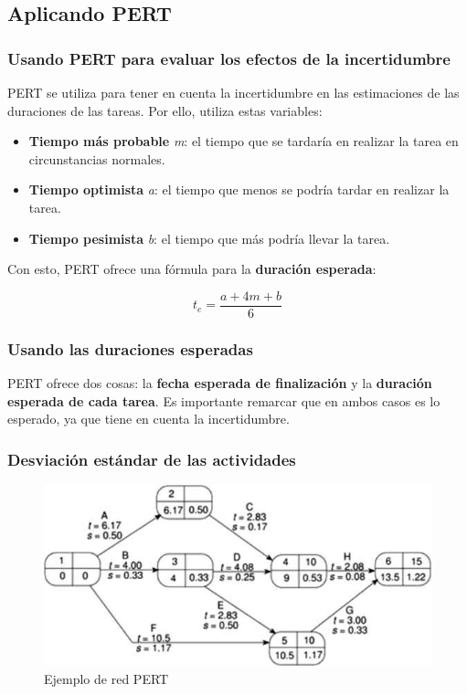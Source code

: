 \documentclass[12pt]{article}
\begin{document}
\subsection{Aplicando PERT}
\label{7.10.0}

\subsubsection{Usando PERT para evaluar los efectos de la incertidumbre}
\label{7.10.1}

{PERT se utiliza para tener en cuenta la incertidumbre en las estimaciones de las duraciones de las tareas. Por ello, utiliza estas variables:}

\begin{itemize}
    \item {\textbf{Tiempo más probable} \textit{m}: el tiempo que se tardaría en realizar la tarea en circunstancias normales.}
    \item {\textbf{Tiempo optimista} \textit{a}: el tiempo que menos se podría tardar en realizar la tarea.}
    \item {\textbf{Tiempo pesimista} \textit{b}: el tiempo que más podría llevar la tarea.}
\end{itemize}

{Con esto, PERT ofrece una fórmula para la \textbf{duración esperada}:}

\begin{equation}
    t_e = \frac{a + 4m + b}{6}
\end{equation}

\subsubsection{Usando las duraciones esperadas}
\label{7.10.2}

{PERT ofrece dos cosas: la \textbf{fecha esperada de finalización} y la \textbf{duración esperada de cada tarea}. Es importante remarcar que en ambos casos es lo esperado, ya que tiene en cuenta la incertidumbre.}

\subsubsection{Desviación estándar de las actividades}
\label{7.10.3}

\begin{figure} [ht]
    \centering
    \includegraphics[keepaspectratio=true, scale=1.25]{images/Red_PERT.jpg}
    \caption{Ejemplo de red PERT}
    \label{fig:7.3}
\end{figure}
\end{document}
